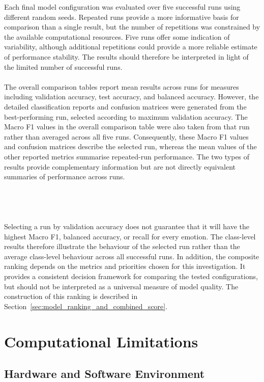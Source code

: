 \documentclass[12pt, a4paper]{report}
\let\oldsection\section
\renewcommand{\section}{%
    \Needspace{6\baselineskip}%
    \oldsection
}
\let\oldsubsection\subsection
\renewcommand{\subsection}{%
    \Needspace{6\baselineskip}%
    \oldsubsection
}
\begin{document}
				Each final model configuration was evaluated over five successful runs using different random seeds. Repeated runs provide a more informative basis for comparison than a single result, but the number of repetitions was constrained by the available computational resources. Five runs offer some indication of variability, although additional repetitions could provide a more reliable estimate of performance stability. The results should therefore be interpreted in light of the limited number of successful runs.\\\\
				The overall comparison tables report mean results across runs for measures including validation accuracy, test accuracy, and balanced accuracy. However, the detailed classification reports and confusion matrices were generated from the best-performing run, selected according to maximum validation accuracy. The Macro F1 values in the overall comparison table were also taken from that run rather than averaged across all five runs. Consequently, these Macro F1 values and confusion matrices describe the selected run, whereas the mean values of the other reported metrics summarise repeated-run performance. The two types of results provide complementary information but are not directly equivalent summaries of performance across runs.\\\\\\\\\\
				Selecting a run by validation accuracy does not guarantee that it will have the highest Macro F1, balanced accuracy, or recall for every emotion. The class-level results therefore illustrate the behaviour of the selected run rather than the average class-level behaviour across all successful runs. In addition, the composite ranking depends on the metrics and priorities chosen for this investigation. It provides a consistent decision framework for comparing the tested configurations, but should not be interpreted as a universal measure of model quality. The construction of this ranking is described in Section~\ref{sec:model_ranking_and_combined_score}.
				
		\section{Computational Limitations}
		\label{sec:computational_limits}
			
			\subsection{Hardware and Software Environment}
				
\end{document}
